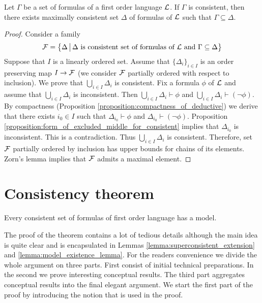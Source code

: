 \begin{proposition}\label{proposition:Lindenbaum_lemma}
Let $\Gamma$ be a set of formulas of a first order language ${\mathcal L}$. If $\Gamma$ is consistent, then there exists maximally consistent set $\Delta$ of formulas of ${\mathcal L}$ such that $\Gamma \subseteq \Delta$.
\end{proposition}
\begin{proof}
Consider a family
$${\mathcal F} = \big\{\Delta \,\big|\,\Delta\mbox{ is consistent set of formulas of }{\mathcal L}\mbox{ and }\Gamma \subseteq \Delta \big\}$$
Suppose that $I$ is a linearly ordered set. Assume that $\{\Delta_i\}_{i\in I}$ is an order preserving map $I \rightarrow {\mathcal F}$ (we consider ${\mathcal F}$ partially ordered with respect to inclusion). We prove that $\bigcup_{i\in I}\Delta_i$ is consistent. Fix a formula $\phi$ of ${\mathcal L}$ and assume that $\bigcup_{i\in I}\Delta_i$ is inconsistent. Then $\bigcup_{i\in I}\Delta_i\vdash \phi$ and $\bigcup_{i\in I}\Delta_i\vdash (\neg \phi)$. By compactness (Proposition \ref{proposition:compactness_of_deductive}) we derive that there exists $i_0\in I$ such that $\Delta_{i_0} \vdash \phi$ and $\Delta_{i_0} \vdash (\neg \phi)$. Proposition \ref{proposition:form_of_excluded_middle_for_consistent} implies that $\Delta_{i_0}$ is inconsistent. This is a contradiction. Thus $\bigcup_{i\in I}\Delta_i$ is consistent. Therefore, set ${\mathcal F}$ partially ordered by inclusion has upper bounds for chains of its elements. Zorn’s lemma implies that ${\mathcal F}$ admits a maximal element.
\end{proof}

\section{Consistency theorem}

\begin{theorem}\label{theorem:consistency_theorem}
Every consistent set of formulas of first order language
has a model.
\end{theorem}
\noindent
The proof of the theorem contains a lot of tedious details although the main idea is quite clear
and is encapsulated in Lemmas \ref{lemma:superconsistent_extension} and \ref{lemma:model_existence_lemma}. For the readers convenience we divide the whole argument
on three parts. First consist of initial technical preparations. In the second we prove interesting
conceptual results. The third part aggregates conceptual results into the final elegant argument.
We start the first part of the proof by introducing the notion that is used in the proof.

